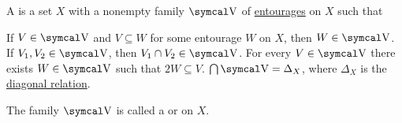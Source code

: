 \begin{Definition}\label{def:uniform_space}\cite[section 8.1]{Engelking1989}
  A  is a set \( X \) with a nonempty family \( \CV \) of \hyperref[def:entourage]{entourages} on \( X \) such that
  \begin{DefEnum}
     If \( V \in \CV \) and \( V \subseteq W \) for some entourage \( W \) on \( X \), then \( W \in \CV \).
     If \( V_1, V_2 \in \CV \), then \( V_1 \cap V_2 \in \CV \).
     For every \( V \in \CV \) there exists \( W \in \CV \) such that \( 2W \subseteq V \).
     \( \bigcap \CV = \Delta_X \), where \( \Delta_X \) is the \hyperref[def:binary_relation/diagonal]{diagonal relation}.
  \end{DefEnum}

  The family \( \CV \) is called a  or  on \( X \).
\end{Definition}

